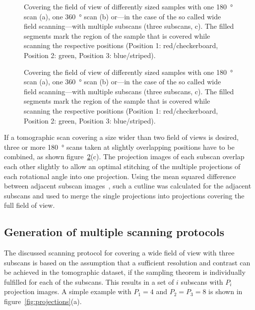 \ifiucr
	\begin{figure}
		\centering
		\caption{Covering the field of view of differently sized samples with one \SI{180}{\degree} scan (a), one \SI{360}{\degree} scan (b) or---in the case of the so called wide field scanning---with multiple subscans (three subscans, c). The filled segments mark the region of the sample that is covered while scanning the respective positions (Position 1: red/checkerboard, Position 2: green, Position 3: blue/striped).}%
		\label{fig:scanning-possibilities}%
	\end{figure}
\else
	\begin{figure}
		\label{subfig:scanning-possibilities}%
		\caption{Covering the field of view of differently sized samples with one \SI{180}{\degree} scan (a), one \SI{360}{\degree} scan (b) or---in the case of the so called wide field scanning---with multiple subscans (three subscans, c). The filled segments mark the region of the sample that is covered while scanning the respective positions (Position 1: red/checkerboard, Position 2: green, Position 3: blue/striped).}%
		\label{fig:scanning-possibilities}%
	\end{figure}
\fi

If a tomographic scan covering a size wider than two field of views is desired, three or more \SI{180}{\degree} scans taken at slightly overlapping positions have to be combined, as shown figure~\ref{fig:scanning-possibilities}(c). The projection images of each subscan overlap each other slightly to allow an optimal stitching of the multiple projections of each rotational angle into one projection. Using the mean squared difference between adjacent subscan images~\cite{Hintermueller2009}, such a cutline was calculated for the adjacent subscans and used to merge the single projections into projections covering the full field of view.

\subsection{Generation of multiple scanning protocols}
The discussed scanning protocol for covering a wide field of view with three subscans is based on the assumption that a sufficient resolution and contrast can be achieved in the tomographic dataset, if the sampling theorem is individually fulfilled for each of the subscans. This results in a set of $i$ subscans with $P_{i}$ projection images. A simple example with $P_{1}=4$ and $P_{2}=P_{3}=8$ is shown in figure~\ref{fig:projections}(a).

